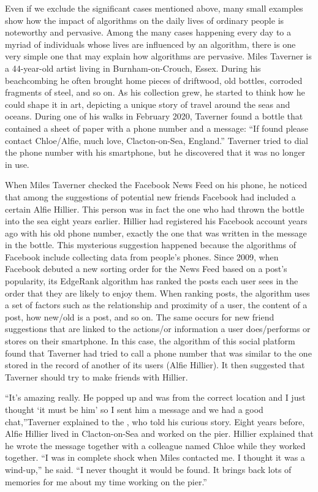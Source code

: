 Even if we exclude the significant cases mentioned above, many small examples show how the impact of algorithms on the daily lives of ordinary people is \hbox{noteworthy} and pervasive. Among the many cases happening every day to a \hbox{myriad} of individuals whose lives are influenced by an algorithm, there is one very simple one that may explain how algorithms are pervasive. Miles Taverner is a 44-year-old artist living in Burnham-on-Crouch, Essex. During his beachcombing he often brought home pieces of driftwood, old bottles, corroded fragments of steel, and so on. As his collection grew, he started to think how he could shape it in art, depicting a unique story of travel around the seas and oceans. During one of his walks in February 2020, Taverner found a bottle that contained a sheet of paper with a phone number and a message: ``If found please contact Chloe/Alfie, much love, Clacton-on-Sea, England.'' Taverner tried to dial the phone number with his smartphone, but he discovered that it was no longer in use.

When Miles Taverner checked the Facebook News Feed on his phone, he noticed that among the suggestions of potential new friends Facebook had included a certain Alfie Hillier. This person was in fact the one who had thrown the bottle into the sea eight years earlier. Hillier had registered his Facebook account years ago with his old phone number, exactly the one that was written in the message in the bottle. This mysterious suggestion happened because the algorithms of Facebook include collecting data from people's phones. Since 2009, when Facebook debuted a new sorting order for the News Feed based on a post's popularity, its EdgeRank algorithm has ranked the posts each user sees in the order that they are likely to enjoy them. When ranking posts, the algorithm uses a set of factors such as the relationship and proximity of a user, the content of a post, how new/old is a post, and so on. The same occurs for new friend suggestions that are linked to the actions/or information a user does/performs or stores on their smartphone. In this case, the algorithm of this social platform found that Taverner had tried to call a phone number that was similar to the one stored in the record of another of its users (Alfie Hillier). It then suggested that Taverner should try to make friends with Hillier.

``It's amazing really. He popped up and was from the correct location and I just thought `it must be him' so I sent him a message and we had a good chat,''\break Taverner explained to the \citet{chap:prolog:BBC:2020}, who told his curious story. Eight years before, Alfie Hillier lived in Clacton-on-Sea and worked on the pier. Hillier explained that he wrote the message together with a colleague named Chloe while they worked together. ``I was in complete shock when Miles contacted me. I thought it was a wind-up,'' he said. ``I never thought it would be found. It brings back lots of memories for me about my time working on the pier.''

